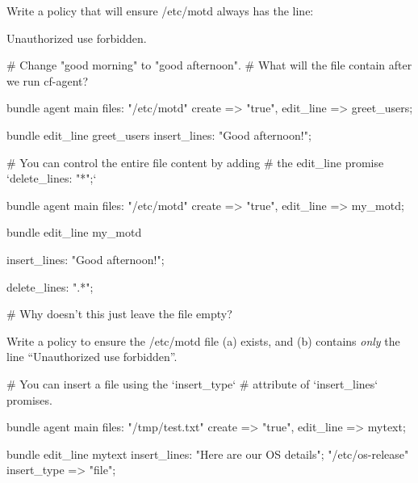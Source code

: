 \begin{aside}
\label{aside:exercise_24}

Write a policy that will ensure /etc/motd always has the line:

Unauthorized use forbidden.

\end{aside}
\begin{codelisting}
\begin{code}
# Change "good morning" to "good afternoon".
# What will the file contain after we run cf-agent?

bundle agent main
{
  files:
      "/etc/motd"
        create  => "true",
        edit_line => greet_users;
}

bundle edit_line greet_users
{
  insert_lines:
      "Good afternoon!";
}
\end{code}
\end{codelisting}
\begin{codelisting}
\begin{code}
# You can control the entire file content by adding
# the edit_line promise `delete_lines: "*";`

bundle agent main
{
  files:
      "/etc/motd"
        create => "true",
        edit_line => my_motd;
}

bundle edit_line my_motd
{
  insert_lines:
      "Good afternoon!";

  delete_lines:
      ".*";
}

# Why doesn't this just leave the file empty?

\end{code}
\end{codelisting}





\begin{aside}
\label{aside:exercise_25}

Write a policy to ensure the /etc/motd file (a) exists, and (b) contains
\emph{only} the line  ``Unauthorized use forbidden''.

\end{aside}
\begin{codelisting}
\begin{code}
# You can insert a file using the `insert_type`
# attribute of `insert_lines` promises.

bundle agent main
{
  files:
      "/tmp/test.txt"
        create => "true",
        edit_line => mytext;
}

bundle edit_line mytext
{
  insert_lines:
      "Here are our OS details";
      "/etc/os-release"
        insert_type => "file";
}
\end{code}
\end{codelisting}






